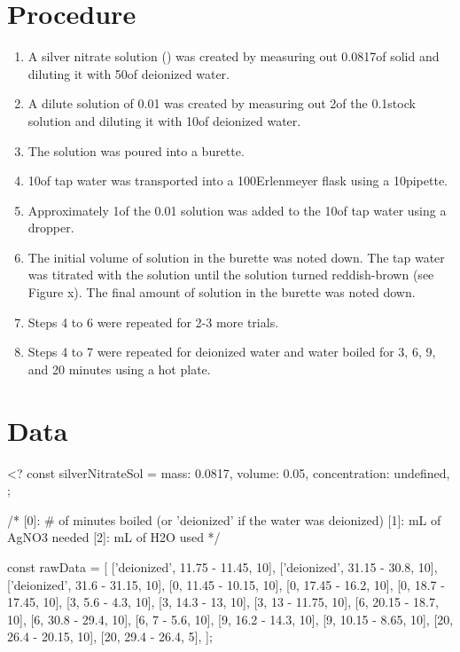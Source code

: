 \documentclass[12pt, demo]{article}
\begin{document}
\section*{Procedure}

\begin{enumerate}
	\item A silver nitrate solution () was created by measuring out 0.0817\g of solid  and diluting it with 50\ml of deionized water.
	\item A dilute solution of 0.01\mpl {} was created by measuring out 2\ml of the 0.1\mpl stock solution and diluting it with 10\ml of deionized water.
	\item The  solution was poured into a burette.
	\item 10\ml of tap water was transported into a 100\ml Erlenmeyer flask using a 10\ml pipette.
	\item Approximately 1\ml of the 0.01\mpl {} solution was added to the 10\ml of tap water using a dropper.
	\item The initial volume of  solution in the burette was noted down. The tap water was titrated with the  solution until the solution turned reddish-brown (see Figure x). The final amount of solution in the burette was noted down.
	\item Steps 4 to 6 were repeated for 2-3 more trials.
	\item Steps 4 to 7 were repeated for deionized water and water boiled for 3, 6, 9, and 20 minutes using a hot plate.
\end{enumerate}

\section*{Data}

<?
const silverNitrateSol = {
	mass: 0.0817,
	volume: 0.05,
	concentration: undefined,
};

/*
[0]: # of minutes boiled (or 'deionized' if the water was deionized)
[1]: mL of AgNO3 needed
[2]: mL of H2O used
*/

const rawData = [
	['deionized', 11.75 - 11.45, 10],
	['deionized', 31.15 - 30.8, 10],
	['deionized', 31.6 - 31.15, 10],
	[0, 11.45 - 10.15, 10],
	[0, 17.45 - 16.2, 10],
	[0, 18.7 - 17.45, 10],
	[3, 5.6 - 4.3, 10],
	[3, 14.3 - 13, 10],
	[3, 13 - 11.75, 10],
	[6, 20.15 - 18.7, 10],
	[6, 30.8 - 29.4, 10],
	[6, 7 - 5.6, 10],
	[9, 16.2 - 14.3, 10],
	[9, 10.15 - 8.65, 10],
	[20, 26.4 - 20.15, 10],
	[20, 29.4 - 26.4, 5],
];
\end{document}
